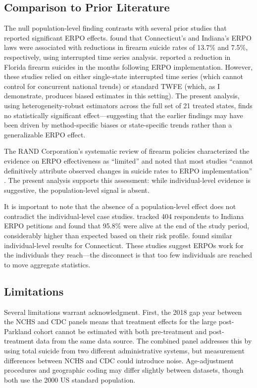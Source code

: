 \documentclass[12pt]{article}
\begin{document}
\subsection{Comparison to Prior Literature}

The null population-level finding contrasts with several prior studies that reported significant ERPO effects. \citet{kivisto2018firearm} found that Connecticut's and Indiana's ERPO laws were associated with reductions in firearm suicide rates of 13.7\% and 7.5\%, respectively, using interrupted time series analysis. \citet{humphreys2019evaluating} reported a reduction in Florida firearm suicides in the months following ERPO implementation. However, these studies relied on either single-state interrupted time series (which cannot control for concurrent national trends) or standard TWFE (which, as I demonstrate, produces biased estimates in this setting). The present analysis, using heterogeneity-robust estimators across the full set of 21 treated states, finds no statistically significant effect---suggesting that the earlier findings may have been driven by method-specific biases or state-specific trends rather than a generalizable ERPO effect.

The RAND Corporation's systematic review of firearm policies characterized the evidence on ERPO effectiveness as ``limited'' and noted that most studies ``cannot definitively attribute observed changes in suicide rates to ERPO implementation'' \citep{rand2023effects}. The present analysis supports this assessment: while individual-level evidence is suggestive, the population-level signal is absent.

It is important to note that the absence of a population-level effect does not contradict the individual-level case studies. \citet{swanson2019criminal} tracked 404 respondents to Indiana ERPO petitions and found that 95.8\% were alive at the end of the study period, considerably higher than expected based on their risk profile. \citet{swanson2014implementation} found similar individual-level results for Connecticut. These studies suggest ERPOs work for the individuals they reach---the disconnect is that too few individuals are reached to move aggregate statistics.

\subsection{Limitations}

Several limitations warrant acknowledgment. First, the 2018 gap year between the NCHS and CDC panels means that treatment effects for the large post-Parkland cohort cannot be estimated with both pre-treatment and post-treatment data from the same data source. The combined panel addresses this by using total suicide from two different administrative systems, but measurement differences between NCHS and CDC could introduce noise. Age-adjustment procedures and geographic coding may differ slightly between datasets, though both use the 2000 US standard population.
\end{document}
